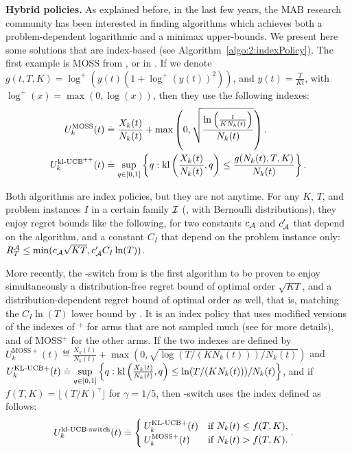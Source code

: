 \textbf{Hybrid policies.}
%
As explained before, in the last few years, the MAB research community has been interested in finding algorithms which achieves both a problem-dependent logarithmic and a minimax upper-bounds.
We present here some solutions that are index-based (see Algorithm~\ref{algo:2:indexPolicy}).
The first example is MOSS from \cite{Audibert2009minimax}, or \KLUCBpp{} in \cite{Menard17}.
If we denote $g(t, T, K) = \log^+(y(t) (1 + \log^+(y(t))^2))$, and $y(t) = \frac{T}{K t}$, with $\log^+(x) = \max(0, \log(x))$,
then they use the following indexes:
\begin{align*}\label{eq:2:indexes_for_MOSS_klUCBpp}
    U^{\mathrm{MOSS}}_k(t) & \overset{.}{=} \frac{X_k(t)}{N_k(t)} + \max\left(0, \sqrt{ \frac{\ln\left(\frac{t}{K N_k(t)}\right)}{N_k(t)} } \right). \\
    U^{\mathrm{kl}\text{-}\mathrm{UCB}^{++}}_k(t) & \overset{.}{=} \sup\limits_{q \in [0,1]} \left\{ q : \mathrm{kl}\left(\frac{X_k(t)}{N_k(t)}, q\right) \leq \frac{g(N_k(t), T, K)}{N_k(t)} \right\}.
\end{align*}

Both algorithms are index policies, but they are not anytime.
For any $K$, $T$, and problem instances $I$ in a certain family $\mathcal{I}$ (\eg, with Bernoulli distributions),
they enjoy regret bounds like the following, for two constants $c_{\mathcal{A}}$ and $c'_{\mathcal{A}}$ that depend on the algorithm, and a constant $C_I$ that depend on the problem instance only: $R_T^{\mathcal{A}} \leq \min( c_{\mathcal{A}} \sqrt{K T}, c'_{\mathcal{A}} C_I \ln(T))$.

More recently, the \klUCB-switch from \cite{GarivierHadiji2018} is the first algorithm to be proven to
enjoy simultaneously a distribution-free regret bound of optimal order $\sqrt{KT}$, and a distribution-dependent regret bound of optimal order as well, that is, matching the $C_I \ln(T)$ lower bound by \cite{LaiRobbins85}.
It is an index policy that uses modified versions of the indexes of \klUCB$^+$ for arms that are not sampled much (see \cite{Honda2019} for more details), and of MOSS$^+$ for the other arms.
If the two indexes
are defined by
$U^{\mathrm{MOSS}+}_k(t) \eqdef \frac{X_k(t)}{N_k(t)} + \max\left(0, \sqrt{ \log\left(T / (K N_k(t))\right) / N_k(t)} \right)$
and
$U^{\mathrm{KL}\text{-}\mathrm{UCB}+}_k(t) \overset{.}{=} \sup\limits_{q \in [0,1]} \left\{ q : \mathrm{kl}\left(\frac{X_k(t)}{N_k(t)}, q\right) \leq \ln(T / (K N_k(t))) / N_k(t) \right\}$,
and if $f(T, K) = \lfloor (T/K)^{\gamma}\rfloor$ for $\gamma=1/5$,
then \klUCB-switch uses the index defined as follows:
\begin{align*}
    U^{\mathrm{kl}\text{-}\mathrm{UCB}\text{-}\mathrm{switch}}_k(t) & \overset{.}{=} \begin{cases}
        U^{\mathrm{KL}\text{-}\mathrm{UCB}+}_k(t) & \text{if } N_k(t) \leq f(T, K), \\
        U^{\mathrm{MOSS}+}_k(t) & \text{if } N_k(t) > f(T, K).
    \end{cases}.
\end{align*}
%

